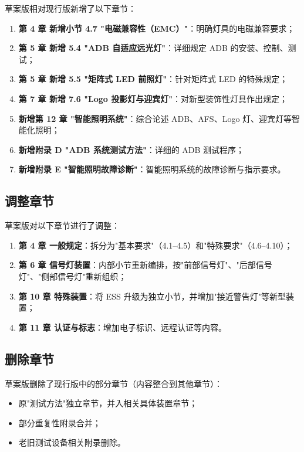 草案版相对现行版新增了以下章节：

\begin{enumerate}[leftmargin=2em]
    \item \textbf{第 4 章 新增小节 4.7 "电磁兼容性（EMC）"}：明确灯具的电磁兼容要求；
    \item \textbf{第 5 章 新增 5.4 "ADB 自适应远光灯"}：详细规定 ADB 的安装、控制、测试；
    \item \textbf{第 5 章 新增 5.5 "矩阵式 LED 前照灯"}：针对矩阵式 LED 的特殊规定；
    \item \textbf{第 7 章 新增 7.6 "Logo 投影灯与迎宾灯"}：对新型装饰性灯具作出规定；
    \item \textbf{新增第 12 章 "智能照明系统"}：综合论述 ADB、AFS、Logo 灯、迎宾灯等智能化照明；
    \item \textbf{新增附录 D "ADB 系统测试方法"}：详细的 ADB 测试程序；
    \item \textbf{新增附录 E "智能照明故障诊断"}：智能照明系统的故障诊断与指示要求。
\end{enumerate}

\subsection{调整章节}

草案版对以下章节进行了调整：

\begin{enumerate}[leftmargin=2em]
    \item \textbf{第 4 章 一般规定}：拆分为"基本要求"（4.1--4.5）和"特殊要求"（4.6--4.10）；
    \item \textbf{第 6 章 信号灯装置}：内部小节重新编排，按"前部信号灯"、"后部信号灯"、"侧部信号灯"重新组织；
    \item \textbf{第 10 章 特殊装置}：将 ESS 升级为独立小节，并增加"接近警告灯"等新型装置；
    \item \textbf{第 11 章 认证与标志}：增加电子标识、远程认证等内容。
\end{enumerate}

\subsection{删除章节}

草案版删除了现行版中的部分章节（内容整合到其他章节）：

\begin{itemize}[leftmargin=2em]
    \item 原"测试方法"独立章节，并入相关具体装置章节；
    \item 部分重复性附录合并；
    \item 老旧测试设备相关附录删除。
\end{itemize}

